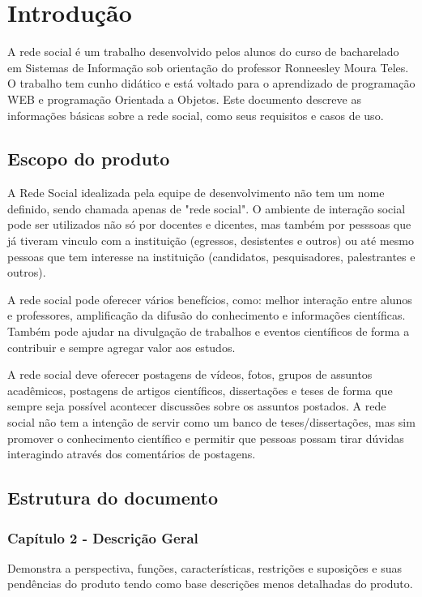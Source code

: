 \chapter{Introdução}

A rede social é um trabalho desenvolvido pelos alunos do curso de bacharelado em Sistemas de Informação sob orientação do professor Ronneesley Moura Teles.
O trabalho tem cunho didático e está voltado para o aprendizado de programação WEB e programação Orientada a Objetos.
Este documento descreve as informações básicas sobre a rede social, como seus requisitos e casos de uso.


\section{Escopo do produto}
A Rede Social idealizada pela equipe de desenvolvimento não tem um nome definido, sendo chamada apenas de "rede social".
O ambiente de interação social pode ser utilizados não só por docentes e dicentes, mas também por pesssoas que já tiveram vinculo com a instituição (egressos, desistentes e outros) ou até mesmo
pessoas que tem interesse na instituição (candidatos, pesquisadores, palestrantes e outros).

A rede social pode oferecer vários benefícios, como: melhor interação entre alunos e professores, amplificação da difusão do conhecimento e informações científicas.
Também pode ajudar na divulgação de trabalhos e eventos científicos de forma a contribuir e sempre agregar valor aos estudos.

A rede social deve oferecer postagens de vídeos, fotos, grupos de assuntos acadêmicos, postagens de artigos científicos, dissertações e teses de forma que sempre seja possível 
acontecer discussões sobre os assuntos postados. A rede social não tem a intenção de servir como um banco de teses/dissertações, mas sim promover o conhecimento científico e permitir
que pessoas possam tirar dúvidas interagindo através dos comentários de postagens. 
  

\section{Estrutura do documento}

\subsection{Capítulo 2 - Descrição Geral}

Demonstra a perspectiva, funções, características, restrições e suposições e suas pendências do produto tendo como base descrições menos detalhadas do produto.

